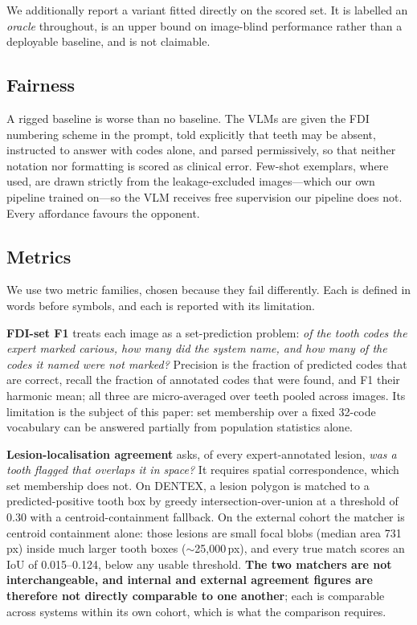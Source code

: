 \documentclass[conference]{IEEEtran}
\begin{document}
We additionally report a variant fitted directly on the scored set. It is
labelled an \emph{oracle} throughout, is an upper bound on image-blind
performance rather than a deployable baseline, and is not claimable.

\subsection{Fairness}
A rigged baseline is worse than no baseline. The VLMs are given the FDI numbering
scheme in the prompt, told explicitly that teeth may be absent, instructed to
answer with codes alone, and parsed permissively, so that neither notation nor
formatting is scored as clinical error. Few-shot exemplars, where used, are drawn
strictly from the leakage-excluded images---which our own pipeline trained
on---so the VLM receives free supervision our pipeline does not. Every affordance
favours the opponent.

\subsection{Metrics}
We use two metric families, chosen because they fail differently. Each is defined
in words before symbols, and each is reported with its limitation.

\textbf{FDI-set F1} treats each image as a set-prediction problem: \emph{of the
tooth codes the expert marked carious, how many did the system name, and how many
of the codes it named were not marked?} Precision is the fraction of predicted
codes that are correct, recall the fraction of annotated codes that were found,
and F1 their harmonic mean; all three are micro-averaged over teeth pooled across
images. Its limitation is the subject of this paper: set membership over a fixed
32-code vocabulary can be answered partially from population statistics alone.

\textbf{Lesion-localisation agreement} asks, of every expert-annotated lesion,
\emph{was a tooth flagged that overlaps it in space?} It requires spatial
correspondence, which set membership does not. On DENTEX, a lesion polygon is
matched to a predicted-positive tooth box by greedy intersection-over-union at a
threshold of 0.30 with a centroid-containment fallback. On the external cohort
the matcher is centroid containment alone: those lesions are small focal blobs
(median area 731\,px) inside much larger tooth boxes ($\sim$25{,}000\,px), and
every true match scores an IoU of 0.015--0.124, below any usable threshold.
\textbf{The two matchers are not interchangeable, and internal and external
agreement figures are therefore not directly comparable to one another}; each is
comparable across systems within its own cohort, which is what the comparison
requires.
\end{document}
